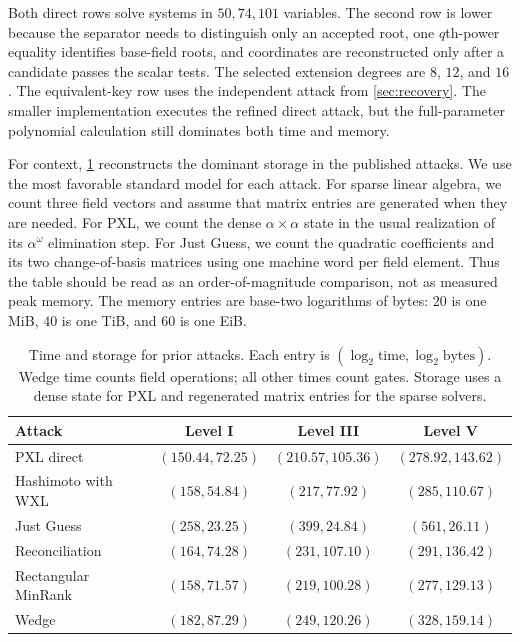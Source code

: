 \documentclass[11pt,a4paper]{article}
\theoremstyle{definition}
\theoremstyle{remark}
\begin{document}
Both direct rows solve systems in $50,74,101$ variables.  The second row is
lower because the separator needs to distinguish only an accepted root, one
$q$th-power equality identifies base-field roots, and coordinates are reconstructed
only after a candidate passes the scalar tests.  The selected extension
degrees are $8$, $12$, and $16$.  The equivalent-key row uses the independent
attack from \cref{sec:recovery}.  The smaller implementation executes the
refined direct attack, but the full-parameter polynomial calculation still
dominates both time and memory.

For context, \cref{tab:prior-time-memory} reconstructs the dominant storage in
the published attacks.  We use the most favorable standard model for each
attack.  For sparse linear algebra, we count three field vectors and assume that
matrix entries are generated when they are needed.  For PXL, we count the dense
$\alpha\times\alpha$ state in the usual realization of its
$\alpha^\omega$ elimination step.  For Just Guess, we count the quadratic
coefficients and its two change-of-basis matrices using one machine word per
field element.  Thus the table should be read as an order-of-magnitude
comparison, not as measured peak memory.  The memory entries are base-two
logarithms of bytes: $20$ is one MiB, $40$ is one TiB, and $60$ is one EiB.

\begin{table}[t]
\centering
\scriptsize
\setlength{\tabcolsep}{3.5pt}
\caption{Time and storage for prior attacks.  Each entry is
$(\log_2\text{time},\log_2\text{bytes})$.  Wedge time counts field operations;
all other times count gates.  Storage uses a dense state for PXL and
regenerated matrix entries for the sparse solvers.}
\label{tab:prior-time-memory}
\begin{tabular}{@{}lccc@{}}
\toprule
Attack & Level I & Level III & Level V \\
\midrule
PXL direct~\cite{QRUOVSpec} & $(150.44,72.25)$ & $(210.57,105.36)$ & $(278.92,143.62)$ \\
Hashimoto with WXL~\cite{QRUOVResponse2026} & $(158,54.84)$ & $(217,77.92)$ & $(285,110.67)$ \\
Just Guess~\cite{JustGuess,GeneralizedPartition} & $(258,23.25)$ & $(399,24.84)$ & $(561,26.11)$ \\
\midrule
Reconciliation~\cite{QRUOVSpec} & $(164,74.28)$ & $(231,107.10)$ & $(291,136.42)$ \\
Rectangular MinRank~\cite{QRUOVSpec,Suzuki} & $(158,71.57)$ & $(219,100.28)$ & $(277,129.13)$ \\
Wedge~\cite{RanWedges} & $(182,87.29)$ & $(249,120.26)$ & $(328,159.14)$ \\
\bottomrule
\end{tabular}
\end{table}
\end{document}
